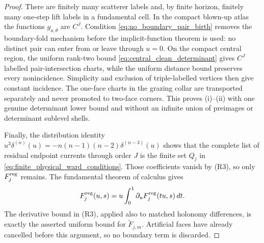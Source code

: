 \documentclass[11pt]{amsart}
\theoremstyle{compactplain}
\theoremstyle{compactdefinition}
\theoremstyle{compactremark}
\begin{document}
\begin{proof}
There are finitely many scatterer labels and, by finite horizon, finitely many
one-step lift labels in a fundamental cell.  In the compact blown-up atlas the
functions \(g_{a,\theta}\) are \(C^J\).  Condition
\eqref{eq:no_boundary_pair_birth} removes the boundary-fold mechanism before
the implicit-function theorem is used: no distinct pair can enter from or
leave through \(u=0\).  On the compact central region, the uniform rank-two
bound \eqref{eq:central_clean_determinant} gives \(C^J\) labelled
pair-intersection charts, while the uniform distance bound preserves every
nonincidence.  Simplicity and exclusion of triple-labelled vertices then give
constant incidence.  The one-face charts in the grazing collar are transported
separately and never promoted to two-face corners.  This proves (i)--(ii) with
one genuine determinant lower bound and without an infinite union of preimages
or determinant sublevel shells.

  Finally, the distribution identity
\(u^3\delta^{(n)}(u)=-n(n-1)(n-2)\delta^{(n-3)}(u)\) shows that the complete
  list of residual endpoint currents through order \(J\) is the finite set
  \(Q_j\) in \eqref{eq:finite_physical_ward_conditions}.  Those coefficients
vanish by (R3), so only \(F_j^{\rm reg}\) remains.  The fundamental theorem of
calculus gives
\[
 F_j^{\rm reg}(u,s)=u\int_0^1
   \partial_uF_j^{\rm reg}(tu,s)\,dt.
\]
The derivative bound in (R3), applied also to matched holonomy differences,
is exactly the asserted uniform bound for \(\widetilde F_{j,m}\).  Artificial
faces have already cancelled before this argument, so no boundary term is
discarded.
\end{proof}
\end{document}
